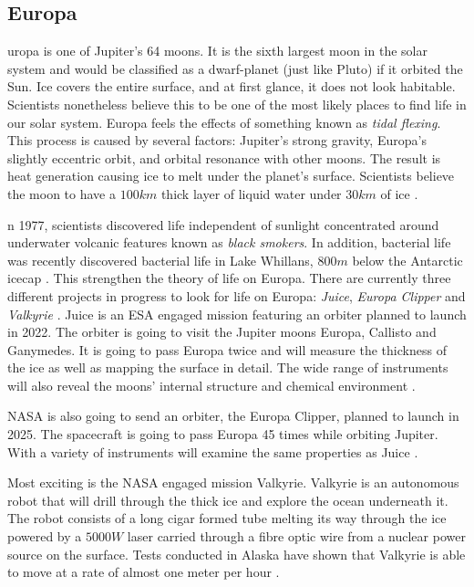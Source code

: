 \begin{multicols}{2}
\subsection{Europa}


 
uropa is one of Jupiter's 64 moons.
It is the sixth largest moon in the solar system and would be classified as a dwarf-planet (just like Pluto) if it orbited the Sun.
Ice covers the entire surface, and at first glance, it does not look habitable.
Scientists nonetheless believe this to be one of the most likely places to find life in our solar system.
Europa feels the effects of something known as \emph{tidal flexing}. This process is caused by several factors: Jupiter's strong gravity, Europa's slightly eccentric orbit, and orbital resonance with other moons. The result is heat generation causing ice to melt under the planet's surface.
Scientists believe the moon to have a $100 km$ thick layer of liquid water under $30 km$ of ice \cite{FPlan03} \cite{FPlan24}.
 
n 1977, scientists discovered life independent of sunlight concentrated around underwater volcanic features known as \emph{black smokers}.
In addition, bacterial life was recently discovered bacterial life in Lake Whillans, $800 m$ below the Antarctic icecap \cite{FPlan04}.
This strengthen the theory of life on Europa.
There are currently three different projects in progress to look for life on Europa: \emph{Juice}, \emph{Europa Clipper} and \emph{Valkyrie} \cite{FPlan24}.
Juice is an ESA engaged mission featuring an orbiter planned to launch in 2022.
The orbiter is going to visit the Jupiter moons Europa, Callisto and Ganymedes.
It is going to pass Europa twice and will measure the thickness of the ice as well as mapping the surface in detail.
The wide range of instruments will also reveal the moons' internal structure and chemical environment \cite{FPlan24}.

NASA is also going to send an orbiter, the Europa Clipper, planned to launch in 2025.
The spacecraft is going to pass Europa 45 times while orbiting Jupiter.
With a variety of instruments will examine the same properties as Juice \cite{FPlan24}.

Most exciting is the NASA engaged mission Valkyrie.
Valkyrie is an autonomous robot that will drill through the thick ice and explore the ocean underneath it.
The robot consists of a long cigar formed tube melting its way through the ice powered by a $5000 W$ laser carried through a fibre optic wire from a nuclear power source on the surface.
Tests conducted in Alaska have shown that Valkyrie is able to move at a rate of almost one meter per hour \cite{FPlan24} \cite{FPlan25}.


\end{multicols}
